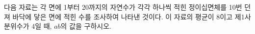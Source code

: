 다음 자료는 각 면에 1부터 20까지의 자연수가 각각 하나씩 적힌 정이십면체를 10번 던져 바닥에 닿은 면에 적힌 수를 조사하여 나타낸 것이다. 이 자료의 평균이 $8$이고 제1사분위수가 $4$일 때, $ab$의 값을 구하시오. 
